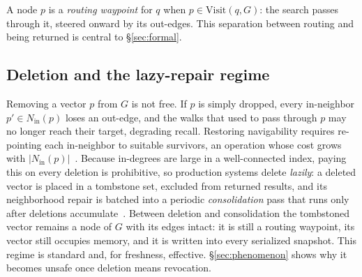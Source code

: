 \documentclass[sigconf, nonacm, review]{acmart}
\newcommand{\Nin}{N_{\mathrm{in}}}
\begin{document}
A node $p$ is a \emph{routing waypoint} for $q$ when $p\in\mathrm{Visit}
(q,G)$: the search passes through it, steered onward by its out-edges. This separation between routing and being returned is central to \S\ref{sec:formal}.

\subsection{Deletion and the lazy-repair regime}
Removing a vector $p$ from $G$ is not free. If $p$ is simply dropped, every
in-neighbor $p'\in\Nin(p)$ loses an out-edge, and the walks that used to
pass through $p$ may no longer reach their target, degrading recall.
Restoring navigability requires re-pointing each in-neighbor to suitable
survivors, an operation whose cost grows with
$|\Nin(p)|$~\cite{DBLP:journals/corr/abs-2105-09613}. Because in-degrees
are large in a well-connected index, paying this on every deletion is
prohibitive, so production systems delete \emph{lazily}: a deleted vector
is placed in a tombstone set, excluded from returned results, and its
neighborhood repair is batched into a periodic \emph{consolidation} pass
that runs only after deletions
accumulate~\cite{DBLP:journals/corr/abs-2105-09613}.
Between deletion and consolidation the tombstoned vector remains a node of
$G$ with its edges intact: it is still a routing waypoint, its vector still
occupies memory, and it is written into every serialized snapshot. This
regime is standard and, for freshness, effective.
\S\ref{sec:phenomenon} shows why it becomes unsafe once deletion means
revocation.
\end{document}

